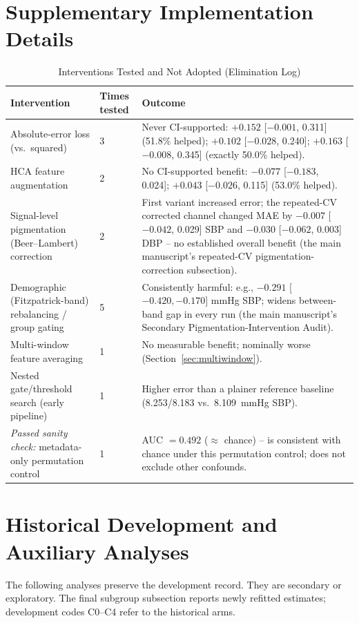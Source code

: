 \section{Supplementary Implementation Details}
\label{app:implementation}
\setcounter{table}{0}
\setcounter{figure}{0}

\begin{table}[t]
\centering
\caption{Interventions Tested and Not Adopted (Elimination Log)}
\label{tab:whatdidnotwork}
\begin{tabular}{p{4.6cm}p{2.4cm}p{7.8cm}}
\toprule
Intervention & Times tested & Outcome \\
\midrule
Absolute-error loss (vs.\ squared) & 3 & Never CI-supported: $+0.152$ [$-0.001$, 0.311] (51.8\% helped); $+0.102$ [$-0.028$, 0.240]; $+0.163$ [$-0.008$, 0.345] (exactly 50.0\% helped). \\
HCA feature augmentation & 2 & No CI-supported benefit: $-0.077$ [$-0.183$, 0.024]; $+0.043$ [$-0.026$, 0.115] (53.0\% helped). \\
Signal-level pigmentation (Beer--Lambert) correction & 2 & First variant increased error; the repeated-CV corrected channel changed MAE by $-0.007$ [$-0.042$, 0.029] SBP and $-0.030$ [$-0.062$, 0.003] DBP -- no established overall benefit (the main manuscript's repeated-CV pigmentation-correction subsection). \\
Demographic (Fitzpatrick-band) rebalancing / group gating & 5 & Consistently harmful: e.g., $-0.291$ [$-0.420,-0.170]$ mmHg SBP; widens between-band gap in every run (the main manuscript's Secondary Pigmentation-Intervention Audit). \\
Multi-window feature averaging & 1 & No measurable benefit; nominally worse (Section~\ref{sec:multiwindow}). \\
Nested gate/threshold search (early pipeline) & 1 & Higher error than a plainer reference baseline (8.253/8.183 vs.\ 8.109~mmHg SBP). \\
\midrule
\emph{Passed sanity check:} metadata-only permutation control & 1 & AUC $=0.492$ ($\approx$ chance) -- is consistent with chance under this permutation control; does not exclude other confounds. \\
\bottomrule
\end{tabular}
\end{table}
\section{Historical Development and Auxiliary Analyses}
The following analyses preserve the development record. They are secondary or exploratory. The final subgroup subsection reports newly refitted estimates; development codes C0--C4 refer to the historical arms.
